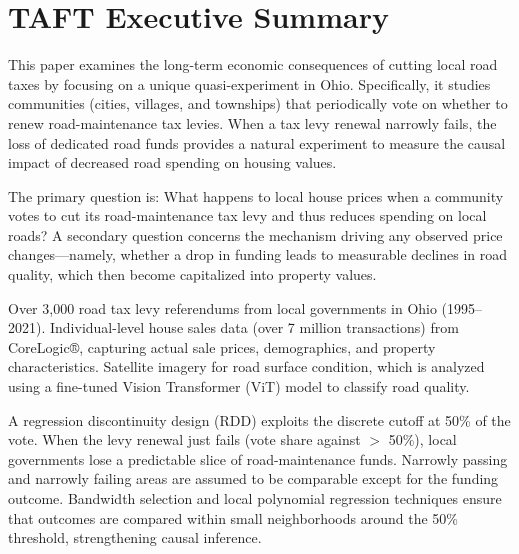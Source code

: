 \section*{TAFT Executive Summary}

This paper examines the long-term economic consequences of cutting local road taxes by focusing on a unique quasi-experiment in Ohio. Specifically, it studies communities (cities, villages, and townships) that periodically vote on whether to renew road-maintenance tax levies. When a tax levy renewal narrowly fails, the loss of dedicated road funds provides a natural experiment to measure the causal impact of decreased road spending on housing values.

 The primary question is: What happens to local house prices when a community votes to cut its road-maintenance tax levy and thus reduces spending on local roads? A secondary question concerns the mechanism driving any observed price changes—namely, whether a drop in funding leads to measurable declines in road quality, which then become capitalized into property values.

 Over 3,000 road tax levy referendums from local governments in Ohio (1995–2021). Individual-level house sales data (over 7 million transactions) from CoreLogic®, capturing actual sale prices, demographics, and property characteristics. Satellite imagery for road surface condition, which is analyzed using a fine-tuned Vision Transformer (ViT) model to classify road quality.

 A regression discontinuity design (RDD) exploits the discrete cutoff at 50\% of the vote. When the levy renewal just fails (vote share against $>$ 50\%), local governments lose a predictable slice of road-maintenance funds. Narrowly passing and narrowly failing areas are assumed to be comparable except for the funding outcome.
Bandwidth selection and local polynomial regression techniques ensure that outcomes are compared within small neighborhoods around the 50\% threshold, strengthening causal inference.


